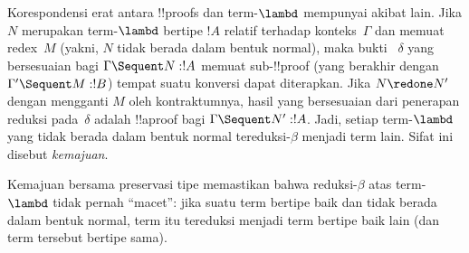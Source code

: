 \documentclass[../../../include/open-logic-section]{subfiles}
\begin{document}
Korespondensi erat antara !!{proof}s dan term-$\lambd$ mempunyai akibat
lain. Jika $N$ merupakan term-$\lambd$ bertipe $!A$ relatif terhadap
konteks~$\Gamma$ dan memuat redex~$M$ (yakni, $N$ tidak berada dalam bentuk
normal), maka bukti ~$\delta$ yang bersesuaian bagi
$\Gamma \Sequent N:!A$ memuat sub-!!{proof} (yang berakhir dengan
$\Gamma' \Sequent M:!B$) tempat suatu konversi dapat diterapkan. Jika
$N \redone N'$ dengan mengganti $M$ oleh kontraktumnya, hasil yang
bersesuaian dari penerapan reduksi pada~$\delta$ adalah !!a{proof} bagi
$\Gamma \Sequent N':!A$. Jadi, setiap term-$\lambd$ yang tidak berada dalam
bentuk normal tereduksi-$\beta$ menjadi term lain. Sifat ini disebut
\emph{kemajuan}.

Kemajuan bersama preservasi tipe memastikan bahwa reduksi-$\beta$ atas
term-$\lambd$ tidak pernah ``macet'': jika suatu term bertipe baik dan tidak
berada dalam bentuk normal, term itu tereduksi menjadi term bertipe baik lain
(dan term tersebut bertipe sama).
\end{document}
